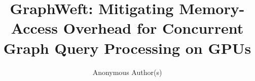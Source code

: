 \documentclass[sigconf,review,anonymous]{acmart}
\title{GraphWeft: Mitigating Memory-Access Overhead for Concurrent Graph Query Processing on GPUs}
\author{Anonymous Author(s)}
\affiliation{\institution{Anonymous Institution}}
\begin{document}
\maketitle







\FloatBarrier

\FloatBarrier





\end{document}
